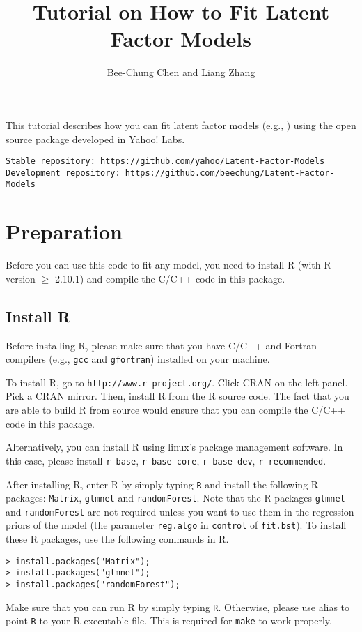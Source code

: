 \documentclass[10pt]{article}
\begin{document}
\title{Tutorial on How to Fit Latent Factor Models}
\author{Bee-Chung Chen and Liang Zhang}
\maketitle

This tutorial describes how you can fit latent factor models (e.g., \cite{rlfm:kdd09,bst:kdd11,gmf:recsys11}) using the open source package developed in Yahoo! Labs.

{\small\begin{verbatim}
Stable repository: https://github.com/yahoo/Latent-Factor-Models
Development repository: https://github.com/beechung/Latent-Factor-Models
\end{verbatim}}

\section{Preparation}

Before you can use this code to fit any model, you need to install R (with R version $\geq$ 2.10.1) and compile the C/C++ code in this package.

\subsection{Install R}

Before installing R, please make sure that you have C/C++ and Fortran compilers (e.g., {\tt gcc} and {\tt gfortran}) installed on your machine.

To install R, go to {\tt http://www.r-project.org/}.  Click CRAN on the left panel.  Pick a CRAN mirror.  Then, install R from the R source code.  The fact that you are able to build R from source would ensure that you can compile the C/C++ code in this package.

Alternatively, you can install R using linux's package management software.  In this case, please install {\tt r-base}, {\tt r-base-core}, {\tt r-base-dev}, {\tt r-recommended}.

After installing R, enter R by simply typing {\tt R} and install the following R packages: {\tt Matrix}, {\tt glmnet} and {\tt randomForest}. Note that the R packages {\tt glmnet} and {\tt randomForest} are not required unless you want to use them in the regression priors of the model (the parameter {\tt reg.algo} in {\tt control} of {\tt fit.bst}).  To install these R packages, use the following commands in R.
{\small\begin{verbatim}
> install.packages("Matrix");
> install.packages("glmnet");
> install.packages("randomForest");
\end{verbatim}}
\noindent Make sure that you can run R by simply typing {\tt R}.  Otherwise, please use alias to point {\tt R} to your R executable file.  This is required for {\tt make} to work properly.
\end{document}
